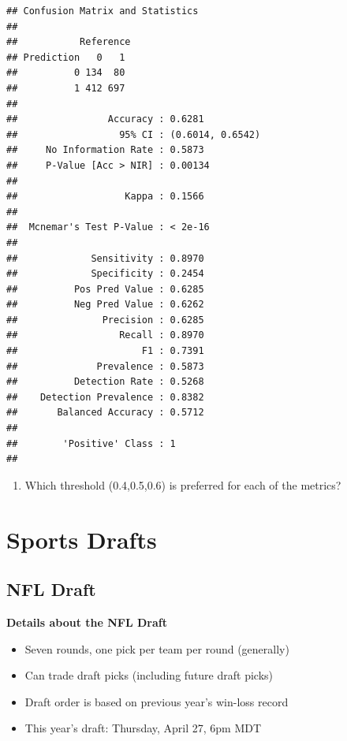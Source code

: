 \documentclass[
  11pt,
]{book}
\providecommand{\tightlist}{%
  \setlength{\itemsep}{0pt}\setlength{\parskip}{0pt}}
\theoremstyle{definition}
\theoremstyle{definition}
\theoremstyle{definition}
\theoremstyle{definition}
\theoremstyle{remark}
\begin{document}
\begin{verbatim}
## Confusion Matrix and Statistics
## 
##           Reference
## Prediction   0   1
##          0 134  80
##          1 412 697
##                                           
##                Accuracy : 0.6281          
##                  95% CI : (0.6014, 0.6542)
##     No Information Rate : 0.5873          
##     P-Value [Acc > NIR] : 0.00134         
##                                           
##                   Kappa : 0.1566          
##                                           
##  Mcnemar's Test P-Value : < 2e-16         
##                                           
##             Sensitivity : 0.8970          
##             Specificity : 0.2454          
##          Pos Pred Value : 0.6285          
##          Neg Pred Value : 0.6262          
##               Precision : 0.6285          
##                  Recall : 0.8970          
##                      F1 : 0.7391          
##              Prevalence : 0.5873          
##          Detection Rate : 0.5268          
##    Detection Prevalence : 0.8382          
##       Balanced Accuracy : 0.5712          
##                                           
##        'Positive' Class : 1               
## 
\end{verbatim}

\newpage

\begin{enumerate}
\def\labelenumi{(\alph{enumi})}
\setcounter{enumi}{9}
\tightlist
\item
  Which threshold (0.4,0.5,0.6) is preferred for each of the metrics?
\end{enumerate}

\hypertarget{sports-drafts}{%
\chapter{Sports Drafts}\label{sports-drafts}}

\hypertarget{nfl-draft}{%
\section{NFL Draft}\label{nfl-draft}}

\textbf{Details about the NFL Draft}

\begin{itemize}
\tightlist
\item
  Seven rounds, one pick per team per round (generally)
\item
  Can trade draft picks (including future draft picks)
\item
  Draft order is based on previous year's win-loss record
\item
  This year's draft: Thursday, April 27, 6pm MDT
\end{itemize}
\end{document}
